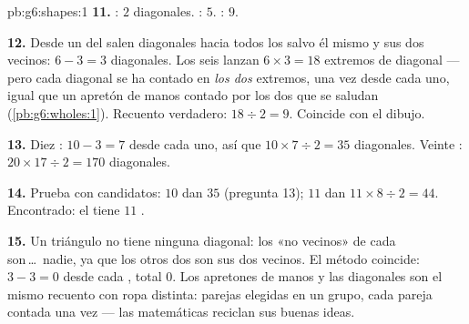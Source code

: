 \begin{solution}{pb:g6:shapes:1}
\textbf{11.} : $2$ diagonales. : $5$.
: $9$.

\textbf{12.} Desde un  del  salen diagonales hacia
todos los  salvo él mismo y sus dos vecinos: $6 - 3 = 3$
diagonales. Los seis  lanzan $6 \times 3 = 18$ extremos de diagonal
--- pero cada diagonal se ha contado en \emph{los dos}
extremos, una vez desde cada uno, igual que un apretón de manos contado
por los dos que se saludan (\cref{pb:g6:wholes:1}). Recuento verdadero:
$18 \div 2 = 9$. Coincide con el dibujo.

\textbf{13.} Diez : $10 - 3 = 7$ desde cada uno, así que
$10 \times 7 \div 2 = 35$ diagonales. Veinte :
$20 \times 17 \div 2 = 170$ diagonales.

\textbf{14.} Prueba con candidatos: $10$  dan $35$ (pregunta
13); $11$  dan $11 \times 8 \div 2 = 44$. Encontrado: el
 tiene $11$ .

\textbf{15.} Un triángulo no tiene ninguna diagonal: los «no vecinos»
de cada  son\,\dots\ nadie, ya que los otros dos
 son sus dos vecinos. El método coincide:
$3 - 3 = 0$ desde cada , total $0$. Los apretones de manos y las
diagonales son el mismo recuento con ropa distinta: parejas elegidas
en un grupo, cada pareja contada una vez --- las matemáticas reciclan
sus buenas ideas.
\end{solution}
